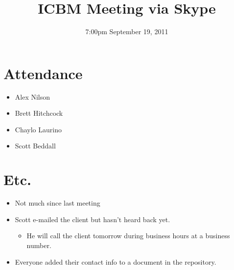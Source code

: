 \documentclass{article}
\begin{document}
\title{ICBM Meeting via Skype}
\date{7:00pm September 19, 2011}
\maketitle

\section{Attendance}
\begin{itemize}
\item Alex Nilson
\item Brett Hitchcock
\item Chaylo Laurino
\item Scott Beddall
\end{itemize}

\section{Etc.}
\begin{itemize}
\item Not much since last meeting
\item Scott e-mailed the client but hasn't heard back yet.
	\begin{itemize}
	\item He will call the client tomorrow during business hours at a business number.
	\end{itemize}
\item Everyone added their contact info to a document in the repository.
\end{itemize}
\end{document}
